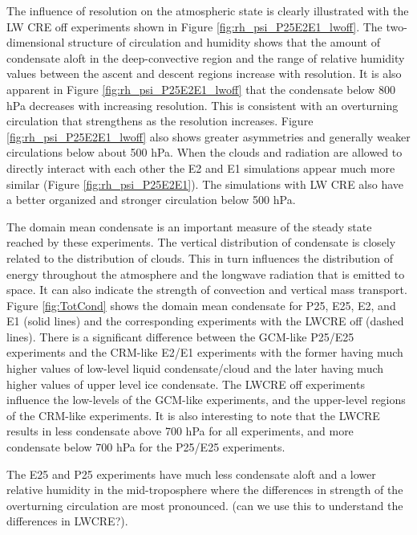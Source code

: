 \documentclass[draft]{agujournal2019}
\begin{document}
The influence of resolution on the atmospheric state is clearly illustrated with the LW CRE off experiments shown 
in Figure \ref{fig:rh_psi_P25E2E1_lwoff}.
The two-dimensional structure of circulation and humidity shows that the amount of condensate aloft in the 
deep-convective region and the range of relative
humidity values between the ascent and descent regions increase with resolution.  It is also apparent in Figure
\ref{fig:rh_psi_P25E2E1_lwoff} that the condensate below 800 hPa decreases with increasing resolution.  
This is consistent with an overturning circulation that 
strengthens as the resolution increases.  Figure \ref{fig:rh_psi_P25E2E1_lwoff} also shows greater asymmetries 
and generally weaker circulations below about 500 hPa.  
When the clouds and radiation are allowed to directly interact with each other the E2 and E1 simulations 
appear much more similar (Figure \ref{fig:rh_psi_P25E2E1}).  The simulations with LW CRE also have a better
organized and stronger circulation below 500 hPa.     

The domain mean condensate is an important measure of the steady state reached by these experiments.  The vertical 
distribution of condensate is closely related to the distribution of clouds.  This in turn influences the distribution of 
energy throughout the atmosphere and the longwave radiation that is emitted to space.  It can also indicate the 
strength of convection 
and vertical mass transport.     Figure \ref{fig:TotCond} shows the domain mean condensate for P25, E25, E2, and E1
(solid lines) and the corresponding experiments with the LWCRE off (dashed lines).  There is a significant difference 
between the GCM-like P25/E25 experiments and the CRM-like E2/E1 experiments with the former having much 
higher values of low-level liquid condensate/cloud and the later having much higher values of upper level ice 
condensate.  The LWCRE off experiments influence the low-levels of the GCM-like experiments, and the upper-level
regions of the CRM-like experiments.     It is also interesting to note that the LWCRE results in less condensate 
above 700 hPa for all experiments, and more condensate below 700 hPa for the P25/E25 experiments.  

The E25 and P25 experiments have much less condensate aloft and a lower relative humidity in the mid-troposphere
where the differences in strength of the overturning circulation are most pronounced. 
(can we use this to understand the differences in LWCRE?).  
\end{document}
